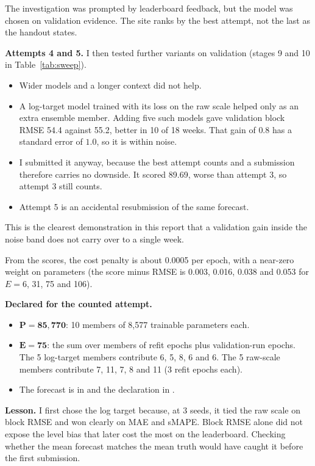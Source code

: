 The investigation was prompted by leaderboard feedback, but the model was chosen on validation evidence. The site ranks by the best attempt, not the last as the handout states.

\textbf{Attempts 4 and 5.} I then tested further variants on validation (stages 9 and 10 in Table~\ref{tab:sweep}).
\begin{itemize}
  \item Wider models and a longer context did not help.
  \item A log-target model trained with its loss on the raw scale helped only as an extra ensemble member. Adding five such models gave validation block RMSE 54.4 against 55.2, better in 10 of 18 weeks. That gain of $0.8$ has a standard error of $1.0$, so it is within noise.
  \item I submitted it anyway, because the best attempt counts and a submission therefore carries no downside. It scored 89.69, worse than attempt 3, so attempt 3 still counts.
  \item Attempt 5 is an accidental resubmission of the same forecast.
\end{itemize}
This is the clearest demonstration in this report that a validation gain inside the noise band does not carry over to a single week.

From the scores, the cost penalty is about 0.0005 per epoch, with a near-zero weight on parameters (the score minus RMSE is 0.003, 0.016, 0.038 and 0.053 for $E=6$, 31, 75 and 106).

\textbf{Declared for the counted attempt.}
\begin{itemize}
  \item $\boldsymbol{P = 85{,}770}$: 10 members of 8{,}577 trainable parameters each.
  \item $\boldsymbol{E = 75}$: the sum over members of refit epochs plus validation-run epochs. The 5 log-target members contribute 6, 5, 8, 6 and 6. The 5 raw-scale members contribute 7, 11, 7, 8 and 11 (3 refit epochs each).
  \item The forecast is in  and the declaration in .
\end{itemize}

\textbf{Lesson.} I first chose the log target because, at 3 seeds, it tied the raw scale on block RMSE and won clearly on MAE and sMAPE. Block RMSE alone did not expose the level bias that later cost the most on the leaderboard. Checking whether the mean forecast matches the mean truth would have caught it before the first submission.

